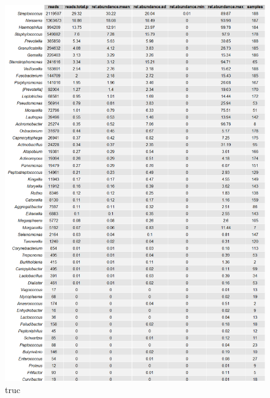 \documentclass[12pt,a4paper]{article}
\begin{document}
\begin{figure}[h]
\begin{center}
\includegraphics[scale=0.5]{img/all_table.png}\hfill
\end{center}
\caption{truc}
\label{bigtable}
\end{figure}
\end{document}
